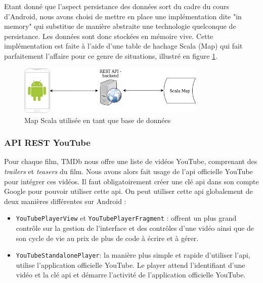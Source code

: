 Etant donné que l'aspect persistance des données sort du cadre du cours d'Android, nous avons choisi de mettre en place une implémentation dite "in memory" qui substitue de manière abstraite une technologie quelconque de persistance. Les données sont donc stockées en mémoire vive.
Cette implémentation est faite à l'aide d'une table de hachage Scala (Map) qui fait parfaitement l'affaire pour ce genre de situations, illustré en figure \ref{map_scala}.
\begin{figure}
    \begin{center}
        \includegraphics[width=0.8\textwidth]{img/schemas/ScalaMap.png}
    \end{center}
    \caption{Map Scala utilisée en tant que base de données}
    \label{map_scala}
\end{figure}

\subsubsection{API REST YouTube}
Pour chaque film, TMDb nous offre une liste de vidéos YouTube, comprenant des \textit{trailers} et \textit{teasers} du film. Nous avons alors fait usage de l'\acrshort{api} officielle YouTube pour intégrer ces vidéos. Il faut obligatoirement créer une clé \acrshort{api} dans son compte Google pour pouvoir utiliser cette \acrshort{api}. On peut utiliser cette \acrshort{api} globalement de deux manières différentes sur Android :
\begin{itemize}
    \item \texttt{YouTubePlayerView} et \texttt{YouTubePlayerFragment} : offrent un plus grand contrôle sur la gestion de l'interface et des contrôles d'une vidéo ainsi que de son cycle de vie au prix de plus de code à écrire et à gérer.
    \item \texttt{YouTubeStandalonePlayer}: la manière plus simple et rapide d'utiliser l'\acrshort{api}, utilise l'application officielle YouTube. Le player attend l'identifiant d'une vidéo et la clé \acrshort{api} et démarre l'activité de l'application officielle YouTube.
\end{itemize}

